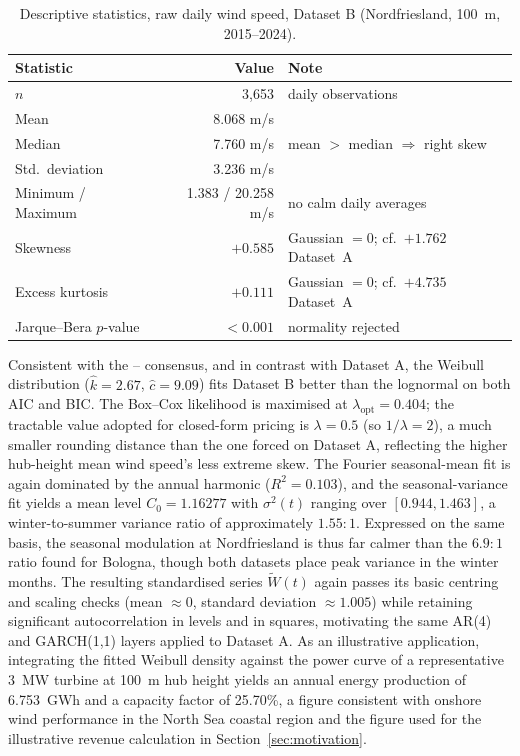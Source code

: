 ﻿\documentclass[11pt, a4paper, twoside]{article}
\begin{document}
\begin{table}[htbp]
\centering
\caption{Descriptive statistics, raw daily wind speed, Dataset B (Nordfriesland, 100~m, 2015--2024).}
\label{tab:desc-b}
\begin{tabular}{lrl}
\toprule
\textbf{Statistic} & \textbf{Value} & \textbf{Note} \\
\midrule
$n$ & 3{,}653 & daily observations \\
Mean & 8.068 m/s & \\
Median & 7.760 m/s & mean $>$ median $\Rightarrow$ right skew \\
Std.\ deviation & 3.236 m/s & \\
Minimum / Maximum & 1.383 / 20.258 m/s & no calm daily averages \\
Skewness & $+0.585$ & Gaussian $= 0$; cf.\ $+1.762$ Dataset~A \\
Excess kurtosis & $+0.111$ & Gaussian $= 0$; cf.\ $+4.735$ Dataset~A \\
Jarque--Bera $p$-value & $< 0.001$ & normality rejected \\
\bottomrule
\end{tabular}
\end{table}

Consistent with the \citet{TullerBrett1984}--\citet{Garcia1998} consensus, and in contrast with Dataset A, the Weibull distribution ($\hat k = 2.67$, $\hat c = 9.09$) fits Dataset B better than the lognormal on both AIC and BIC. The Box--Cox likelihood is maximised at $\lambda_{\text{opt}} = 0.404$; the tractable value adopted for closed-form pricing is $\lambda = 0.5$ (so $1/\lambda = 2$), a much smaller rounding distance than the one forced on Dataset A, reflecting the higher hub-height mean wind speed's less extreme skew. The Fourier seasonal-mean fit is again dominated by the annual harmonic ($R^2 = 0.103$), and the seasonal-variance fit yields a mean level $C_0 = 1.16277$ with $\sigma^2(t)$ ranging over $[0.944, 1.463]$, a winter-to-summer variance ratio of approximately $1.55{:}1$. Expressed on the same basis, the seasonal modulation at Nordfriesland is thus far calmer than the $6.9{:}1$ ratio found for Bologna, though both datasets place peak variance in the winter months. The resulting standardised series $\widetilde W(t)$ again passes its basic centring and scaling checks (mean $\approx 0$, standard deviation $\approx 1.005$) while retaining significant autocorrelation in levels and in squares, motivating the same AR(4) and GARCH(1,1) layers applied to Dataset A. As an illustrative application, integrating the fitted Weibull density against the power curve of a representative 3~MW turbine at 100~m hub height yields an annual energy production of 6.753~GWh and a capacity factor of 25.70\%, a figure consistent with onshore wind performance in the North Sea coastal region and the figure used for the illustrative revenue calculation in Section~\ref{sec:motivation}.
\end{document}
